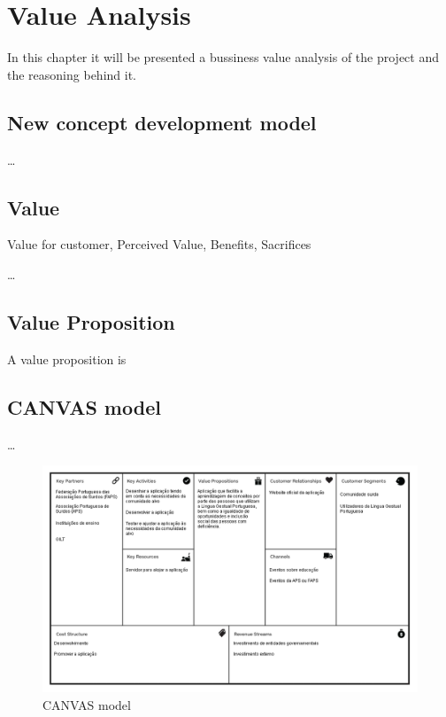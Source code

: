 
\chapter{Value Analysis} %
\label{chap:Chapter2} %

In this chapter it will be presented a bussiness value analysis of the project and the reasoning behind it. 

\section{New concept development model}

\dots

\section{Value}

Value for customer, Perceived Value, Benefits, Sacrifices

\dots

\section{Value Proposition}

A value proposition is 

\section{CANVAS model}

\dots

\begin{figure}[H]
\centering
\includegraphics[width=\textwidth,keepaspectratio]{ch3/assets/CANVAS.png}
\caption[CANVAS]{CANVAS model}
\label{fig:CANVAS}
\end{figure}

